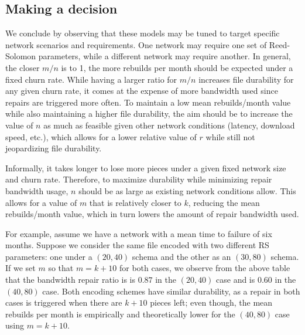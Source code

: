 \subsection{Making a decision}

We conclude by observing that these models may be tuned to target specific network scenarios and requirements. One network may require one set of Reed-Solomon parameters, while a different network may require another. In general, the closer $m/n$ is to 1, the more rebuilds per month should be expected under a fixed churn rate. While having a larger ratio for $m/n$ increases file durability for any given churn rate, it comes at the expense of more bandwidth used since repairs are triggered more often. To maintain a low mean rebuilds/month value while also maintaining a higher file durability, the aim should be to increase the value of $n$ as much as feasible given other network conditions (latency, download speed, etc.), which allows for a lower relative value of $r$ while still not jeopardizing file durability.

Informally, it takes longer to lose more pieces under a given fixed network size and churn rate. Therefore, to maximize durability while minimizing repair bandwidth usage, $n$ should be as large as existing network conditions allow. This allows for a value of $m$ that is relatively closer to $k$, reducing the mean rebuilds/month value, which in turn lowers the amount of repair bandwidth used.

For example, assume we have a network with a mean time to failure of six months.
Suppose we consider the same file encoded with two different RS parameters:
one under a $(20,40)$ schema and the other as an $(30,80)$ schema. If we set $m$ so that $m=k+10$ for both cases, we observe from the above table
that the bandwidth repair ratio is is $0.87$ in the $(20,40)$ case and is $0.60$ in the $(40,80)$ case. Both encoding schemes have similar durability, as a repair in both cases is triggered when there are $k+10$ pieces left; even though, the mean rebuilds per month
is empirically and theoretically lower for the $(40,80)$ case using $m=k+10$.
